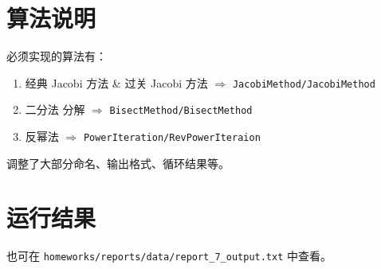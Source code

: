\documentclass{article}
\begin{document}
\section{算法说明}

必须实现的算法有：

\begin{enumerate}
    \item 经典 Jacobi 方法 & 过关 Jacobi 方法 $\Rightarrow$ \verb|JacobiMethod/JacobiMethod|
    \item 二分法 分解 $\Rightarrow$ \verb|BisectMethod/BisectMethod|
    \item 反幂法 $\Rightarrow$ \verb|PowerIteration/RevPowerIteraion|
\end{enumerate}

调整了大部分命名、输出格式、循环结果等。

\section{运行结果}

也可在 \verb|homeworks/reports/data/report_7_output.txt| 中查看。



\newpage
\end{document}
